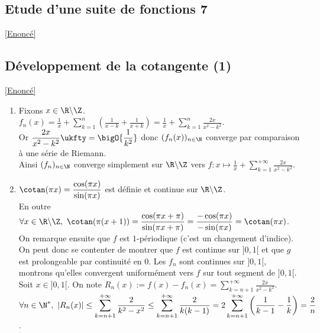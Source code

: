 \documentclass{book}
\begin{document}
	\subsection{Etude d'une suite de fonctions 7}\label{sec:etude-dune-suite-de-fonction-7}
		\textcolor{blue}{\hyperref[Etude d'une suite de fonctions 7]{[Enoncé]}}\\
		
	\subsection{Développement de la cotangente (1)}
	\label{sec:developpement-de-la-cotangente-(1)}
	\textcolor{blue}{\hyperref[Développement de la cotangente (1)]{[Enoncé]}}\\
	\begin{enumerate}[leftmargin=*]
		\item Fixons $x\in \R\backslash\Z$.\\
		$f_n(x)=\displaystyle\frac{1}{x}+\sum_{k=1}^n\left(\frac{1}{x-k}+\frac{1}{x+k}\right)=\frac{1}{x}+\sum_{k=1}^n\frac{2x}{x^2-k^2}$.\\
		Or $\dfrac{2x}{x^2-k^2}\ukfty=\bigO{\dfrac{1}{k^2}}$ donc $(f_n(x))_{n\in \N}$ converge par comparaison à une série de Riemann.\\
		Ainsi $(f_n)_{n\in \N}$ converge simplement sur $\R\backslash\Z$ vers $f:x\mapsto\displaystyle\frac{1}{x}+\sum_{k=1}^{+\infty}\frac{2x}{x^2-k^2}$.\\
		\item $\cotan(\pi x)=\dfrac{\cos(\pi x)}{\sin(\pi x)}$ est définie et continue sur $\R\backslash\Z$.\\
		En outre $\forall x\in \R\backslash\Z,\ \cotan(\pi(x+1))=\dfrac{\cos(\pi x+\pi)}{\sin(\pi x+\pi)}=\dfrac{-\cos(\pi x)}{-\sin(\pi x)}=\cotan(\pi x)$.\\
		On remarque ensuite que $f$ est $1$-périodique (c'est un changement d'indice). On peut donc se contenter de montrer que $f$ est continue sur $]0,1[$ et que $g$ est prolongeable par continuité en $0$.
		Les $f_n$ sont continues sur $]0,1[$, montrons qu'elles convergent uniformément vers $f$ sur tout segment de $]0,1[$.\\
		Soit $x\in ]0,1[$. On note $R_n(x):=f(x)-f_n(x)=\displaystyle\sum_{k=n+1}^{+\infty}\frac{2x}{x^2-k^2}$.\\
		$\forall n\in \N^*,\ |R_n(x)|\leq \displaystyle\sum_{k=n+1}^{+\infty}\frac{2}{k^2-x^2}\leq \sum_{k=n+1}^{+\infty}\frac{2}{k(k-1)}=2\sum_{k=n+1}^{+\infty}\left(\frac{1}{k-1}-\frac{1}{k}\right)=\frac{2}{n}$.\\

\end{enumerate}
\end{document}

